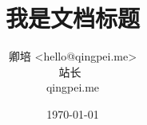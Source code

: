 \title{我是文档标题}

\author{
        卿培 <hello@qingpei.me> \\
        站长~\\
        qingpei.me
}

\date{\today}
